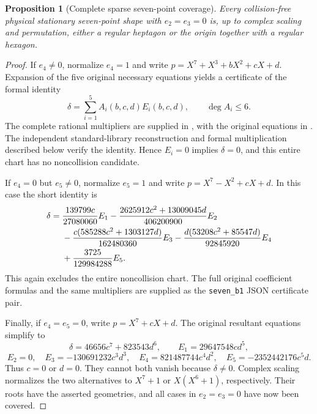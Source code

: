 \documentclass[11pt]{article}
\newtheorem{proposition}[theorem]{Proposition}
\theoremstyle{remark}
\numberwithin{equation}{section}
\begin{document}
\begin{proposition}[Complete sparse seven-point coverage]
\label{prop:seven-sparse-coverage}
Every collision-free physical stationary seven-point shape with
$e_2=e_3=0$ is, up to complex scaling and permutation, either a regular
heptagon or the origin together with a regular hexagon.
\end{proposition}
\begin{proof}
If $e_4\ne0$, normalize $e_4=1$ and write
$p=X^7+X^3+bX^2+cX+d$. Expansion of the five original necessary
equations yields a certificate of the formal identity
\begin{equation}\label{eq:seven-first-e4-collision}
 \delta=\sum_{i=1}^5 A_i(b,c,d)E_i(b,c,d),
 \qquad \deg A_i\le6.
\end{equation}
The complete rational multipliers are supplied in
, with the original
equations in .
The independent standard-library reconstruction and formal multiplication
described below verify the identity. Hence $E_i=0$ implies
$\delta=0$, and this entire chart has no noncollision candidate.

If $e_4=0$ but $e_5\ne0$, normalize $e_5=1$ and write
$p=X^7-X^2+cX+d$. In this case the short identity is
\begin{align}
 \delta={}&\frac{139799c}{27080060}E_1
 -\frac{2625912c^2+13009045d}{406200900}E_2\notag\\
 &-\frac{c(585288c^2+1303127d)}{162480360}E_3
 -\frac{d(53208c^2+85547d)}{92845920}E_4\notag\\
 &+\frac{3725}{129984288}E_5.
 \label{eq:seven-first-e5-collision}
\end{align}
This again excludes the entire noncollision chart. The full original
coefficient formulas and the same multipliers are supplied as the
\texttt{seven\_b1} JSON certificate pair.

Finally, if $e_4=e_5=0$, write $p=X^7+cX+d$. The original resultant
equations simplify to
\[
 \delta=46656c^7+823543d^6,\qquad
 E_1=29647548cd^5,
\]
\[
 E_2=0,\quad E_3=-130691232c^3d^3,\quad
 E_4=821487744c^4d^2,\quad E_5=-2352442176c^5d.
\]
Thus $c=0$ or $d=0$. They cannot both vanish because $\delta\ne0$.
Complex scaling normalizes the two alternatives to $X^7+1$ or
$X(X^6+1)$, respectively. Their roots have the asserted geometries,
and all cases in $e_2=e_3=0$ have now been covered.
\end{proof}
\end{document}
